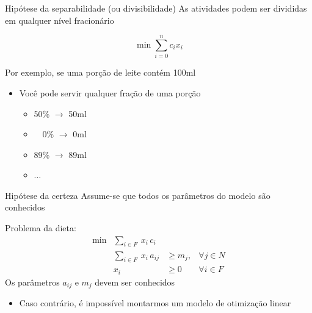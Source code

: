 \documentclass[compress,mathserif]{beamer}
\begin{document}

\begin{frame}{Hipótese da separabilidade (ou divisibilidade)}
As atividades podem ser divididas em qualquer nível fracionário

\vspace{0.5cm}

$$\min \sum_{i = 0}^n c_i x_i$$

\vspace{0.5cm}

Por exemplo, se uma porção de leite contém 100ml
\begin{itemize}
    \item Você pode servir qualquer fração de uma porção
    \begin{itemize}
        \item 50\% $\rightarrow$ 50ml
        \item ~~0\% $\rightarrow$  0ml
        \item 89\% $\rightarrow$ 89ml
        \item $\ldots$
    \end{itemize}
\end{itemize}

\end{frame}


\begin{frame}{Hipótese da certeza}
Assume-se que todos os parâmetros do modelo são conhecidos

\vspace{0.5cm}

Problema da dieta:
$$\begin{matrix}
        \min & \sum_{i \in F}~x_i\,c_i\\ 
             & \sum_{i \in F}~x_i\,a_{ij} & \geq m_j, & \forall j \in N \\
             & x_i & \geq 0 & \forall i \in F
        \end{matrix}    
$$
Os parâmetros $a_{ij}$ e $m_j$ devem ser conhecidos
\begin{itemize}
    \item Caso contrário, é impossível montarmos um modelo de otimização linear
\end{itemize}

\end{frame}

\end{document}
